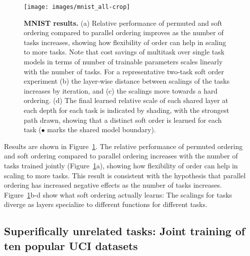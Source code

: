 \documentclass{article}
\theoremstyle{definition}
\theoremstyle{remark}
\begin{document}
\begin{figure}[h]
\centering
\texttt{[image: images/mnist\_all-crop]}
\caption{\textbf{MNIST results.} (a) Relative performance of permuted and soft ordering compared to parallel ordering improves as the number of tasks increases, showing how flexibility of order can help in scaling to more tasks. 
Note that cost savings of multitask over single task models in terms of number of trainable parameters scales linearly with the number of tasks.
For a representative two-task soft order experiment (b) the layer-wise distance between scalings of the tasks increases by iteration, and (c) the scalings move towards a hard ordering. (d) The final learned relative scale of each shared layer at each depth for each task is indicated by shading, with the strongest path drawn, showing that a distinct soft order is learned for each task
($\bullet$ marks the shared model boundary).
}
  \label{fig:mnist_results}
\end{figure}
Results are shown in Figure~\ref{fig:mnist_results}.
The relative performance of permuted ordering and soft ordering compared to parallel ordering increases with the number of tasks trained jointly (Figure~\ref{fig:mnist_results}a), showing how flexibility of order can help in scaling to more tasks.
This result is consistent with the hypothesis that parallel ordering has increased negative effects as the number of tasks increases. 
Figure~\ref{fig:mnist_results}b-d show what soft ordering actually learns: The scalings for tasks diverge as layers specialize to different functions for different tasks.

\subsection{Superifically unrelated tasks: Joint training of ten popular UCI datasets}
\end{document}
